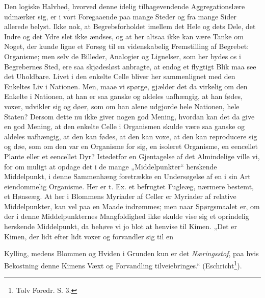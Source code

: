 \documentclass[12pt,a4paper]{book}
\begin{document}
Den logiske Halvhed, hvorved denne idelig tilbagevendende
Aggregationslære udmærker sig, er i vort Foregaaende paa mange Steder og
fra mange Sider allerede belyst. Ikke nok, at Begrebsforholdet imellem
det Hele og dets Dele, det Indre og det Ydre slet ikke ændses, og at her
altsaa ikke kan være Tanke om Noget, der kunde ligne et Forsøg til en
videnskabelig Fremstilling af Begrebet: Organisme; men selv de Billeder,
Analogier og Lignelser, som her bydes os i Begrebernes Sted, ere saa
skjødesløst anbragte, at endog et flygtigt Blik maa see det Uholdbare.
Livet i den enkelte Celle bliver her sammenlignet med den Enkeltes Liv i
Nationen. Men, maae vi spørge, gjælder det da virkelig om den Enkelte i
Nationen, at han er saa ganske og aldeles uafhængig, at han fødes, voxer,
udvikler sig og døer, som om han alene udgjorde hele Nationen, hele
Staten? Dersom dette nu ikke giver nogen god Mening, hvordan kan det da
give en god Mening, at den enkelte Celle i Organismen skulde være saa
ganske og aldeles uafhængig, at den kan fødes, at den kan voxe, at den
kan reproducere sig og døe, som om den var en Organisme for sig, en
isoleret Organisme, en eencellet Plante eller et eencellet Dyr? Istedetfor
en Gjentagelse af det Almindelige ville vi, for om muligt at opdage det i
de mange „Middelpunkter“ herskende Middelpunkt, i denne Sammenhæng
foretrække en Undersøgelse af en i sin Art eiendommelig Organisme. Her er
t. Ex. et befrugtet Fugleæg, nærmere bestemt, et Hønseæg. At her i
Blommens Myriader af Celler er Myriader af relative Middelpunkter, kan
vel paa en Maade indrømmes; men naar Spørgsmaalet er, om der i denne
Middelpunkternes Mangfoldighed ikke skulde vise sig et oprindelig
herskende Middelpunkt, da behøve vi jo blot at henvise til Kimen. „Det er
Kimen, der lidt efter lidt voxer og forvandler sig til en

\setcounter{footnote}{0}
Kylling, medens Blommen og Hviden i Grunden kun er det
\emph{Næringsstof}, paa hvis Bekostning denne Kimens Væxt og Forvandling
tilveiebringes.“ (Eschricht\footnote{Tolv Foredr. S. 3.}).
\end{document}
